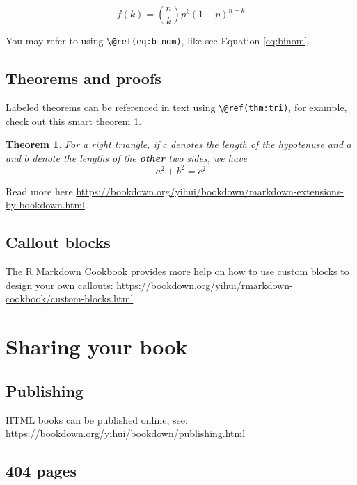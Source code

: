 \documentclass[
  12pt,
  a4paper,
]{book}
\newtheorem{theorem}{Theorem}[chapter]
\theoremstyle{definition}
\theoremstyle{definition}
\theoremstyle{definition}
\theoremstyle{definition}
\theoremstyle{remark}
\begin{document}
\begin{equation} 
  f\left(k\right) = \binom{n}{k} p^k\left(1-p\right)^{n-k}
  \label{eq:binom}
\end{equation}

You may refer to using \texttt{\textbackslash{}@ref(eq:binom)}, like see Equation \eqref{eq:binom}.

\section{Theorems and proofs}\label{theorems-and-proofs}

Labeled theorems can be referenced in text using \texttt{\textbackslash{}@ref(thm:tri)}, for example, check out this smart theorem \ref{thm:tri}.

\begin{theorem}
\protect\hypertarget{thm:tri}{}\label{thm:tri}For a right triangle, if \(c\) denotes the \emph{length} of the hypotenuse
and \(a\) and \(b\) denote the lengths of the \textbf{other} two sides, we have
\[a^2 + b^2 = c^2\]
\end{theorem}

Read more here \url{https://bookdown.org/yihui/bookdown/markdown-extensions-by-bookdown.html}.

\section{Callout blocks}\label{callout-blocks}

The R Markdown Cookbook provides more help on how to use custom blocks to design your own callouts: \url{https://bookdown.org/yihui/rmarkdown-cookbook/custom-blocks.html}

\chapter{Sharing your book}\label{share}

\section{Publishing}\label{publishing}

HTML books can be published online, see: \url{https://bookdown.org/yihui/bookdown/publishing.html}

\section{404 pages}\label{pages}
\end{document}
